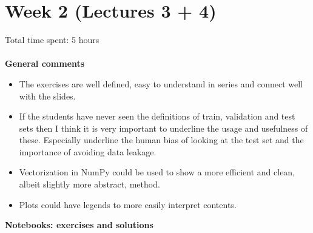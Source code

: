 \documentclass{article}
\begin{document}
\section{Week 2 (Lectures 3 + 4)}
Total time spent: 5 hours
\\\\
\textbf{General comments}
\begin{itemize}
    \item The exercises are well defined, easy to understand in series and connect well with the slides.
    \item If the students have never seen the definitions of train, validation and test sets then I think it is very important to underline the usage and usefulness of these. Especially underline the human bias of looking at the test set and the importance of avoiding data leakage.
    \item Vectorization in NumPy could be used to show a more efficient and clean, albeit slightly more abstract, method.
    \item Plots could have legends to more easily interpret contents.
\end{itemize}


\textbf{Notebooks: exercises and solutions}
\end{document}
